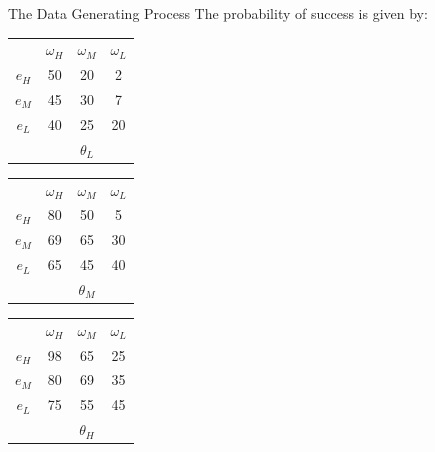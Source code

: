 \documentclass[aspectratio=169]{beamer}
\begin{document}
\begin{frame}{The Data Generating Process}
The probability of success is given by:\\
\bigskip
\centering
\begin{tabular}{ c|c|c|c|}
  
  \multicolumn{1}{c}{} & \multicolumn{1}{c}{$\omega_H$} & \multicolumn{1}{c}{$\omega_M$} & \multicolumn{1}{c}{$\omega_L$}\\
  \cline{2-4}
  $e_H$ & 50 & 20 & 2 \\
  \cline{2-4}
  $e_M$ & 45 & 30 & 7 \\
  \cline{2-4}
  $e_L$ & 40 & 25 & 20 \\
  \cline{2-4}
  \multicolumn{1}{c}{} & \multicolumn{1}{c}{} & \multicolumn{1}{c}{$\theta_L$} & \multicolumn{1}{c}{}\\
\end{tabular}
\hspace{.3cm} %
\begin{tabular}{ c|c|c|c|}
  
  \multicolumn{1}{c}{} & \multicolumn{1}{c}{$\omega_H$} & \multicolumn{1}{c}{$\omega_M$} & \multicolumn{1}{c}{$\omega_L$}\\
  \cline{2-4}
  $e_H$ & 80 & 50 & 5 \\
  \cline{2-4}
  $e_M$ & 69 & 65 & 30 \\
  \cline{2-4}
  $e_L$ & 65 & 45 & 40 \\
  \cline{2-4}
  \multicolumn{1}{c}{} & \multicolumn{1}{c}{} & \multicolumn{1}{c}{$\theta_M$} & \multicolumn{1}{c}{}\\
\end{tabular}
\hspace{.3cm} %
\begin{tabular}{ c|c|c|c|}
  
  \multicolumn{1}{c}{} & \multicolumn{1}{c}{$\omega_H$} & \multicolumn{1}{c}{$\omega_M$} & \multicolumn{1}{c}{$\omega_L$}\\
  \cline{2-4}
  $e_H$ & 98 & 65 & 25 \\
  \cline{2-4}
  $e_M$ & 80 & 69 & 35 \\
  \cline{2-4}
  $e_L$ & 75 & 55 & 45 \\
  \cline{2-4}
  \multicolumn{1}{c}{} & \multicolumn{1}{c}{} & \multicolumn{1}{c}{$\theta_H$} & \multicolumn{1}{c}{}\\
\end{tabular}


    
\end{frame}
\end{document}
